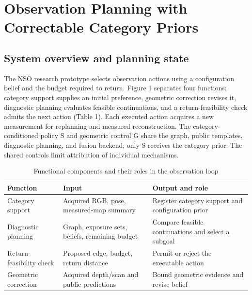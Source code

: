 \documentclass[11pt,a4paper]{article}
\providecommand{\hypertarget}[2]{#2}
\newlength{\JournalTableWidth}
\begin{document}
\hypertarget{observation-planning-with-correctable-category-priors}{%
\section{Observation Planning with Correctable Category Priors}\label{observation-planning-with-correctable-category-priors}}

\hypertarget{system-overview-and-planning-state}{%
\subsection{System overview and planning state}\label{system-overview-and-planning-state}}

The NSO research prototype selects observation actions using a configuration belief and the budget required to return. Figure 1 separates four functions: category support supplies an initial preference, geometric correction revises it, diagnostic planning evaluates feasible continuations, and a return-feasibility check admits the next action (Table 1). Each executed action acquires a new measurement for replanning and measured reconstruction. The category-conditioned policy S and geometric control G share the graph, public templates, diagnostic planning, and fusion backend; only S receives the category prior. The shared controls limit attribution of individual mechanisms.

\begin{table}[!htbp]
\caption{Functional components and their roles in the observation loop}\label{tab:1}
\small\renewcommand{\arraystretch}{1.12}\setlength{\tabcolsep}{3pt}
\setlength{\JournalTableWidth}{\dimexpr\linewidth-4\tabcolsep\relax}
\begin{tabular}{@{}>{\raggedright\arraybackslash}p{0.16\JournalTableWidth} >{\raggedright\arraybackslash}p{0.32\JournalTableWidth} >{\raggedright\arraybackslash}p{0.52\JournalTableWidth}@{}}
\toprule
Function & Input & Output and role \\
\midrule
Category support & Acquired RGB, pose, measured-map summary & Register category support and configuration prior \\
Diagnostic planning & Graph, exposure sets, beliefs, remaining budget & Compare feasible continuations and select a subgoal \\
Return-feasibility check & Proposed edge, budget, return distance & Permit or reject the executable action \\
Geometric correction & Acquired depth/scan and public predictions & Bound geometric evidence and revise belief \\
\bottomrule
\end{tabular}
\end{table}
\end{document}
